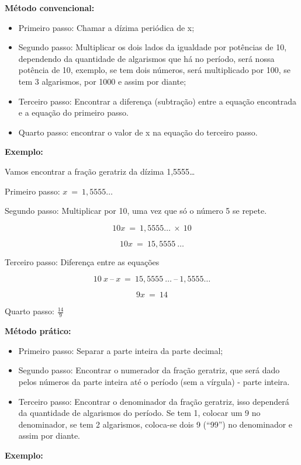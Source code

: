{{{\textbf{Método convencional:}

\begin{itemize}
\item
  Primeiro passo: Chamar a dízima periódica de x;
\item
  Segundo passo: Multiplicar os dois lados da igualdade por potências de
  10, dependendo da quantidade de algarismos que há no período, será
  nossa potência de 10, exemplo, se tem dois números, será multiplicado
  por 100, se tem 3 algarismos, por 1000 e assim por diante;
\item
  Terceiro passo: Encontrar a diferença (subtração) entre a equação
  encontrada e a equação do primeiro passo.
\item
  Quarto passo: encontrar o valor de x na equação do terceiro passo.
\end{itemize}

\textbf{Exemplo:}

Vamos encontrar a fração geratriz da dízima 1,5555\ldots{}

Primeiro passo: \(x\  = \ 1,5555\ldots\)

Segundo passo: Multiplicar por 10, uma vez que só o número 5 se repete.

\[10x\  = \ 1,5555\ldots\  \times \ 10\]

\[10x\  = \ 15,5555\ \ldots\]

Terceiro passo: Diferença entre as equações

\[10\ x\ –\ x\  = \ 15,5555\ \ldots\ –\ 1,5555\ldots\]

\[9x\  = \ 14\]

Quarto passo: \(\frac{14}{9}\)

\textbf{Método prático:}

\begin{itemize}
\item
  Primeiro passo: Separar a parte inteira da parte decimal;
\item
  Segundo passo: Encontrar o numerador da fração geratriz, que será dado
  pelos números da parte inteira até o período (sem a vírgula) - parte
  inteira.
\item
  Terceiro passo: Encontrar o denominador da fração geratriz, isso
  dependerá da quantidade de algarismos do período. Se tem 1, colocar um
  9 no denominador, se tem 2 algarismos, coloca-se dois 9 (``99'') no
  denominador e assim por diante.
\end{itemize}

\textbf{Exemplo:}

}}}

